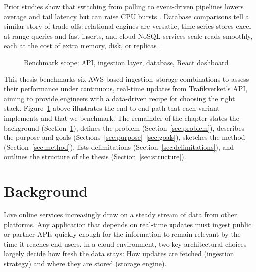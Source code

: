 \documentclass[nomenclature, english, biblatex]{kththesis}
\numberwithin{listing}{chapter}
\begin{document}
\noindent
Prior studies show that switching from polling to event-driven pipelines lowers average and tail latency but can raise CPU bursts \cite{Trindade2021EDAImpact}. 
Database comparisons tell a similar story of trade-offs: relational engines are versatile, time-series stores excel at range queries and fast inserts, and cloud NoSQL services scale reads smoothly, each at the cost of extra memory, disk, or replicas \cite{Heldt2021SciTS,Grzesik2020EdgeIoTBenchmark,Vergara2021PerformanceTSDB}.

\begin{figure}[htbp]
 \centering
 \caption{Benchmark scope: API, ingestion layer, database, React dashboard}
 \label{fig:pipeline}
\end{figure}

\noindent
This thesis benchmarks six AWS-based ingestion–storage combinations to assess their performance under continuous, real-time updates from Trafikverket's API, aiming to provide engineers with a data-driven recipe for choosing the right stack. Figure~\ref{fig:pipeline} above illustrates the end-to-end path that each variant implements and that we benchmark.
The remainder of the chapter states the background (Section~\ref{sec:background}), defines the problem (Section~\ref{sec:problem}), describes the purpose and goals (Sections~\ref{sec:purpose}–\ref{sec:goals}), sketches the method (Section~\ref{sec:method}), lists delimitations (Section~\ref{sec:delimitations}), and outlines the structure of the thesis (Section~\ref{sec:structure}).




\section{Background}
\label{sec:background}
Live online services increasingly draw on a steady stream of data from other platforms. Any application that depends on real-time updates must ingest public or partner \glspl{API} quickly enough for the information to remain relevant by the time it reaches end-users. In a cloud environment, two key architectural choices largely decide how fresh the data stays: How updates are fetched (ingestion strategy) and where they are stored (storage engine).
\end{document}

